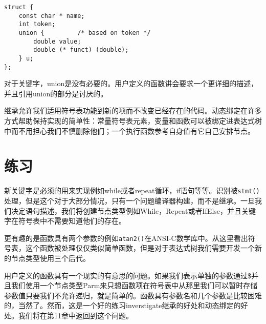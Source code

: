 \begin{lstlisting}
struct {
	const char * name;
	int token;
	union {			/* based on token */
		double value;
		double (* funct) (double);
	} u;
};
\end{lstlisting}

对于关键字，union是没有必要的。用户定义的函数讲会要求一个更详细的描述，并且引用union的部分是讨厌的。

继承允许我们适用符号表功能到新的项而不改变已经存在的代码。动态绑定在许多方式帮助保持实现的简单性：常量符号表元素，变量和函数可以被绑定进表达式树中而不用担心我们不慎删除他们；一个执行函数参考自身值有它自己安排节点。

\section{练习}

新关键字是必须的用来实现例如while或者repeat循环，if语句等等。识别被\verb|stmt()|处理，但是这个对于大部分情况，只有一个问题编译器构建，而不是继承。一旦我们决定语句描述，我们将创建节点类型例如While，Repeat或者IfElse，并且关键字在符号表中不需要知道他们的存在。

更有趣的是函数具有两个参数的例如\verb|atan2()|在ANSI-C数学库中。从这里看出符号表，这个函数被处理仅仅类似简单函数，但是对于表达式树我们需要开发一个新的节点类型使用三个后代。

用户定义的函数具有一个现实的有意思的问题。如果我们表示单独的参数通过\$并且我们使用一个节点类型Parm来只想函数项在符号表中从那里我们可以暂时存储参数值只要我们不允许递归，就是简单的。函数具有参数名和几个参数是比较困难的，当然了。然而，这是一个好的练习inverstigate继承的好处和动态绑定的好处。我们将在第11章中返回到这个问题。
